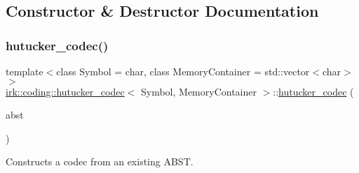 \subsection{Constructor \& Destructor Documentation}
\mbox{\label{classirk_1_1coding_1_1hutucker__codec_a7f078fd7029ad74ebd8aa5fab70fbc8c}} 
\subsubsection{\texorpdfstring{hutucker\+\_\+codec()}{hutucker\_codec()}\hspace{0.1cm}{\footnotesize\ttfamily [1/2]}}
{\footnotesize\ttfamily template$<$class Symbol  = char, class Memory\+Container  = std\+::vector$<$char$>$$>$ \\
\mbox{\hyperlink{classirk_1_1coding_1_1hutucker__codec}{irk\+::coding\+::hutucker\+\_\+codec}}$<$ Symbol, Memory\+Container $>$\+::\mbox{\hyperlink{classirk_1_1coding_1_1hutucker__codec}{hutucker\+\_\+codec}} (\begin{DoxyParamCaption}\item[{\mbox{\hyperlink{classirk_1_1alphabetical__bst}{alphabetical\+\_\+bst}}$<$ Symbol, uint16\+\_\+t, Memory\+Container $>$}]{abst }\end{DoxyParamCaption})\hspace{0.3cm}{\ttfamily [inline]}}



Constructs a codec from an existing A\+B\+ST. 

\mbox{\label{classirk_1_1coding_1_1hutucker__codec_afbe980e04113a8874acd6ecb1f26b094}} 

